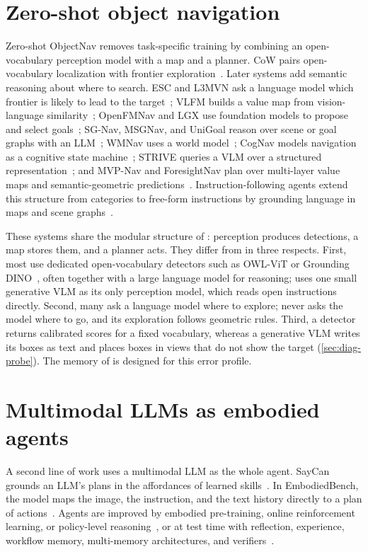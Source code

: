 \section{Zero-shot object navigation}
\label{sec:lit-objnav}
Zero-shot ObjectNav removes task-specific training by combining an open-vocabulary perception model with a map and a
planner. CoW pairs open-vocabulary localization with frontier exploration~\cite{gadre2022cows}. Later systems add
semantic reasoning about where to search. ESC and L3MVN ask a language model which frontier is likely to lead to
the target~\cite{zhou2023esc,yu2023l3mvn}; VLFM builds a value map from vision-language similarity~\cite{yokoyama2023vlfm};
OpenFMNav and LGX use foundation models to propose and select goals~\cite{kuang2024openfmnav,dorbala2024lgx};
SG-Nav, MSGNav, and UniGoal reason over scene or goal graphs with an LLM~\cite{yin2024online,huang2025msgnav,yin2025unigoal};
WMNav uses a world model~\cite{nie2025wmnav}; CogNav models navigation as a cognitive state machine~\cite{cao2024cognav};
STRIVE queries a VLM over a structured representation~\cite{zhu2025strive}; and MVP-Nav and ForesightNav plan over
multi-layer value maps and semantic-geometric predictions~\cite{xie2026mvpnav,liu2026foresightnav}.
Instruction-following agents extend this structure from categories to free-form instructions by grounding
language in maps and scene graphs~\cite{long2024instructnav,rana2023sayplan,werby2024hierarchical,huang2023vlmaps,shah2022lmnav}.

These systems share the modular structure of \ours: perception produces detections, a map stores them, and a
planner acts. They differ from \ours in three respects. First, most use dedicated open-vocabulary detectors such as
OWL-ViT or Grounding DINO~\cite{minderer2022owlvit,liu2024groundingdino}, often together with a large language model
for reasoning; \ours uses one small generative VLM as its only perception model, which reads open instructions
directly. Second, many ask a language model where to explore; \ours never asks the model where to go, and its
exploration follows geometric rules. Third, a detector returns calibrated scores for a fixed vocabulary, whereas a
generative VLM writes its boxes as text and places boxes in views that do not show the target
(\cref{sec:diag-probe}). The memory of \ours is designed for this error profile.

\section{Multimodal LLMs as embodied agents}
\label{sec:lit-agents}
A second line of work uses a multimodal LLM as the whole agent. SayCan grounds an LLM's plans in the affordances
of learned skills~\cite{ahn2022saycan}. In EmbodiedBench, the model maps the image, the instruction, and the text
history directly to a plan of actions~\cite{yang2025embodiedbench}. Agents are improved by embodied pre-training,
online reinforcement learning, or policy-level reasoning~\cite{chen2025transforming,wang2025vagen,zhang2025embodiedx,liu2025robogpt},
or at test time with reflection, experience, workflow memory, multi-memory architectures, and
verifiers~\cite{shinn2023reflexion,zhao2023expel,chen2024automanual,wang2024agent,lei2025robomemory,singhi2026think}.

